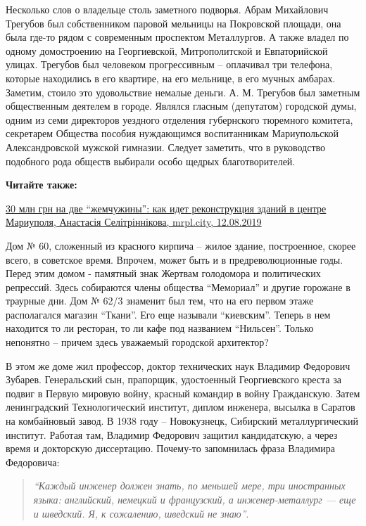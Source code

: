 Несколько слов о владельце столь заметного подворья. Абрам Михайлович Трегубов
был собственником паровой мельницы на Покровской площади, она была где-то рядом
с современным проспектом Металлургов. А также владел по одному домостроению  на
Георгиевской, Митрополитской и Евпаторийской улицах. Трегубов был человеком
прогрессивным – оплачивал три телефона, которые находились в его квартире, на
его мельнице, в его мучных амбарах. Заметим, стоило это удовольствие немалые
деньги. А. М. Трегубов был заметным общественным деятелем в городе. Являлся
гласным (депутатом) городской думы, одним из семи директоров уездного отделения
губернского тюремного комитета, секретарем Общества пособия нуждающимся
воспитанникам Мариупольской Александровской мужской гимназии. Следует заметить,
что в руководство подобного рода обществ выбирали особо щедрых благотворителей.

\textbf{Читайте также:} 

\href{https://mrpl.city/news/view/30-mln-grn-na-dve-zhemchuzhiny-kak-idet-rekonstruktsiya-zdanij-v-tsentre-mariupolya-foto}{%
30 млн грн на две \enquote{жемчужины}: как идет реконструкция зданий в центре Мариуполя, Анастасія Селітріннікова, mrpl.city, 12.08.2019}

Дом № 60, сложенный из красного кирпича – жилое здание, построенное, скорее
всего, в советское время. Впрочем, может быть и в предреволюционные годы. Перед
этим домом - памятный знак Жертвам голодомора и политических репрессий. Здесь
собираются члены общества \enquote{Мемориал} и другие горожане в траурные дни. Дом №
62/3 знаменит был тем, что на его первом этаже располагался магазин \enquote{Ткани}.
Его еще называли \enquote{киевским}. Теперь в нем находится то ли ресторан, то ли кафе
под названием \enquote{Нильсен}. Только непонятно – причем здесь уважаемый городской
архитектор?

В этом же доме жил профессор, доктор технических наук Владимир Федорович
Зубарев. Генеральский сын, прапорщик, удостоенный Георгиевского креста за
подвиг в Первую мировую войну, красный командир в войну Гражданскую. Затем
ленинградский Технологический институт, диплом инженера, высылка в Саратов на
комбайновый завод. В 1938 году – Новокузнецк, Сибирский металлургический
институт. Работая там, Владимир Федорович защитил кандидатскую, а через время и
докторскую диссертацию. Почему-то запомнилась фраза Владимира Федоровича:

\begin{quote}
\emph{\enquote{Каждый инженер должен знать, по меньшей мере, три иностранных языка:
английский, немецкий и французский, а инженер-металлург — еще и шведский. Я, к
сожалению, шведский не знаю}}.
\end{quote}

